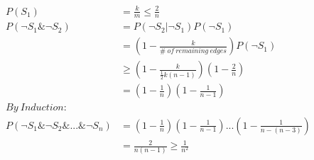 \documentclass{article}
\begin{document}
\begin{align*}
	 P(S_1) &= \frac{k}{m} \leq \frac{2}{n}\\
	 P(\neg S_1 \& \neg S_2) &= P(\neg S_2 | \neg S_1)P(\neg S_1)\\
	 						&= (1-\frac{k}{\# \: of \: remaining \: edges})P(\neg S_1)\\
	 						& \geq (1 - \frac{k}{\frac{1}{2}k(n-1)})(1-\frac{2}{n})\\
	 						&=(1-\frac{1}{n})(1-\frac{1}{n-1})\\
	 By\: Induction:\\
	 P(\neg S_1 \& \neg S_2 \& ... \& \neg S_n) &= (1-\frac{1}{n})(1-\frac{1}{n-1})...(1-\frac{1}{n-(n-3)})\\
	 						&= \frac{2}{n(n-1)} \geq \frac{1}{n^2}
\end{align*}
\end{document}
